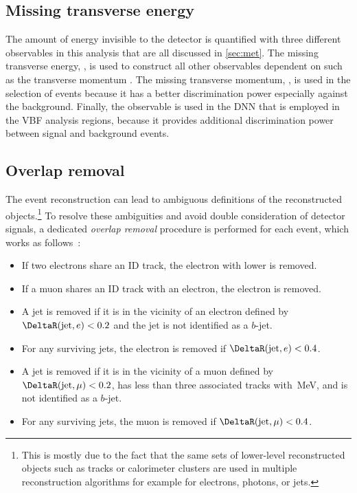 \subsection{Missing transverse energy}
The amount of energy invisible to the detector is quantified with three different observables in this analysis that are all discussed in \cref{sec:met}.
The missing transverse energy, \ETmiss, is used to construct all other observables dependent on \ETmiss such as the transverse momentum \mT.
The missing transverse momentum, \pTmiss, is used in the selection of events because it has a better discrimination power especially against the \Zjets background.
Finally, the \METSig observable is used in the DNN that is employed in the VBF analysis regions, because
it provides additional discrimination power between signal and background events.


\subsection{Overlap removal}
\label{subsec:overlap-removal}

The event reconstruction can lead to ambiguous definitions of the reconstructed objects.\footnote{This is mostly due to the fact that the same sets of lower-level reconstructed objects such as tracks or calorimeter clusters are used in multiple reconstruction algorithms for example for electrons, photons, or jets.}
To resolve these ambiguities and avoid double consideration of detector signals, a dedicated \emph{overlap removal} procedure is performed for each event, which works as follows~\cite{PLACEHOLDER:PAPER}:
\begin{itemize}
    \item If two electrons share an ID track, the electron with lower \ET is removed.
    \item If a muon shares an ID track with an electron, the electron is removed.
    \item A jet is removed if it is in the vicinity of an electron defined by $\DeltaR(\text{jet}, e) < 0.2$ and the jet is not identified as a $b$-jet.
    \item For any surviving jets, the electron is removed if $\DeltaR(\text{jet}, e) < 0.4$.
    \item A jet is removed if it is in the vicinity of a muon defined by $\DeltaR(\text{jet}, \mu) < 0.2$, has less than three associated tracks with \,MeV, and is not identified as a $b$-jet.
    \item For any surviving jets, the muon is removed if $\DeltaR(\text{jet}, \mu) < 0.4$.
\end{itemize}

